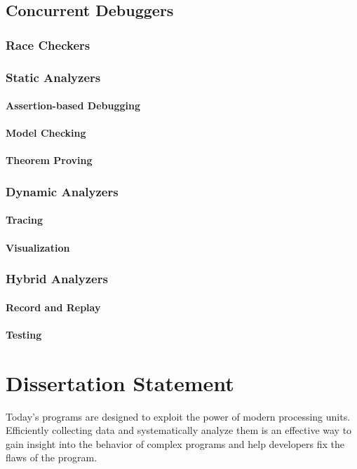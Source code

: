 \subsection{Concurrent Debuggers}
\subsubsection{Race Checkers}
\subsubsection{Static Analyzers}
\paragraph{Assertion-based Debugging}
\paragraph{Model Checking}
\paragraph{Theorem Proving}
\subsubsection{Dynamic Analyzers}
\paragraph{Tracing}
\paragraph{Visualization}
\subsubsection{Hybrid Analyzers}
\paragraph{Record and Replay}
\paragraph{Testing}


\section{Dissertation Statement}
Today's programs are designed to exploit the power of modern processing units. Efficiently collecting data and systematically analyze them is an effective way to gain insight into the behavior of complex programs and help developers fix the flaws of the program.

